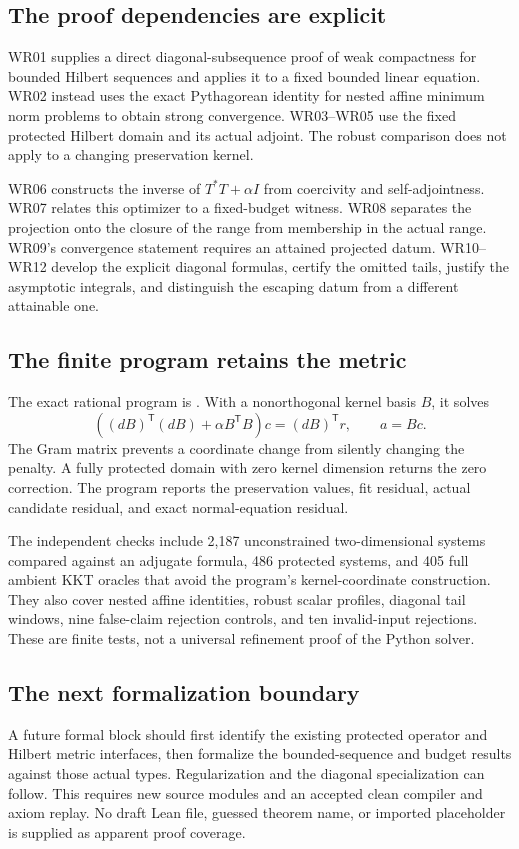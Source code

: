\documentclass[11pt]{article}
\begin{document}
\subsection{The proof dependencies are explicit}
WR01 supplies a direct diagonal-subsequence proof of weak compactness for bounded Hilbert sequences and applies it to a fixed bounded linear equation. WR02 instead uses the exact Pythagorean identity for nested affine minimum norm problems to obtain strong convergence. WR03--WR05 use the fixed protected Hilbert domain and its actual adjoint. The robust comparison does not apply to a changing preservation kernel.

WR06 constructs the inverse of $T^*T+\alpha I$ from coercivity and self-adjointness. WR07 relates this optimizer to a fixed-budget witness. WR08 separates the projection onto the closure of the range from membership in the actual range. WR09's convergence statement requires an attained projected datum. WR10--WR12 develop the explicit diagonal formulas, certify the omitted tails, justify the asymptotic integrals, and distinguish the escaping datum from a different attainable one.

\subsection{The finite program retains the metric}
The exact rational program is . With a nonorthogonal kernel basis $B$, it solves
\[
 ((dB)^{\mathsf T}(dB)+\alpha B^{\mathsf T}B)c=(dB)^{\mathsf T}r,
 \qquad a=Bc.
\]
The Gram matrix prevents a coordinate change from silently changing the penalty. A fully protected domain with zero kernel dimension returns the zero correction. The program reports the preservation values, fit residual, actual candidate residual, and exact normal-equation residual.

The independent checks include 2,187 unconstrained two-dimensional systems compared against an adjugate formula, 486 protected systems, and 405 full ambient KKT oracles that avoid the program's kernel-coordinate construction. They also cover nested affine identities, robust scalar profiles, diagonal tail windows, nine false-claim rejection controls, and ten invalid-input rejections. These are finite tests, not a universal refinement proof of the Python solver.

\subsection{The next formalization boundary}
A future formal block should first identify the existing protected operator and Hilbert metric interfaces, then formalize the bounded-sequence and budget results against those actual types. Regularization and the diagonal specialization can follow. This requires new source modules and an accepted clean compiler and axiom replay. No draft Lean file, guessed theorem name, or imported placeholder is supplied as apparent proof coverage.
\end{document}
